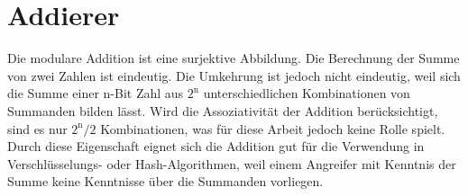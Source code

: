 \section{Addierer}
\label{sec:grundlagen_add}

Die modulare Addition ist eine surjektive Abbildung. Die Berechnung der Summe von zwei Zahlen ist eindeutig. Die Umkehrung ist jedoch nicht eindeutig,
weil sich die Summe einer n-Bit Zahl aus $2^{\text{n}}$ unterschiedlichen Kombinationen von Summanden bilden lässt. Wird die Assoziativität der Addition berücksichtigt,
sind es nur $2^{\text{n}}/2$ Kombinationen, was für diese Arbeit jedoch keine Rolle spielt. Durch diese Eigenschaft eignet sich die Addition gut für die Verwendung
in Verschlüsselungs- oder Hash-Algorithmen, weil einem Angreifer mit Kenntnis der Summe keine Kenntnisse über die Summanden vorliegen.

